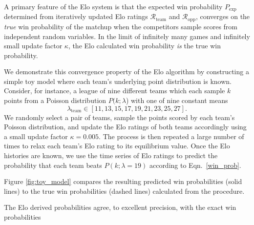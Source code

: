 \documentclass[aps,prc,reprint,amsmath,superscriptaddress,nofootinbib]{revtex4-1}
\newcommand{\R}{\mathcal{R}}
\begin{document}

A primary feature of the Elo system is that the expected win probability $P_\text{exp}$ determined from iteratively updated Elo ratings $\R_\text{team}$ and $\R_\text{opp}$, converges on the \emph{true} win probability of the matchup when the competitors sample scores from independent random variables.
In the limit of infinitely many games and infinitely small update factor $\kappa$, the Elo calculated win probability \emph{is} the true win probability.

We demonstrate this convergence property of the Elo algorithm by constructing a simple toy model where each team's underlying point distribution is known.
Consider, for instance, a league of nine different teams which each sample $k$ points from a Poisson distribution $P(k; \lambda$) with one of nine constant means
\begin{equation}
  \lambda_\text{team} \in [11, 13, 15, 17, 19, 21, 23, 25, 27].
\end{equation}
We randomly select a pair of teams, sample the points scored by each team's Poisson distribution, and update the Elo ratings of both teams accordingly using a small update factor $\kappa = 0.005$.
The process is then repeated a large number of times to relax each team's Elo rating to its equilibrium value.
Once the Elo histories are known, we use the time series of Elo ratings to predict the probability that each team beats $P(k; \lambda=19)$ according to Eqn.~\eqref{win_prob}.

Figure \ref{fig:toy_model} compares the resulting predicted win probabilities (solid lines) to the true win probabilities (dashed lines) calculated from the procedure.

The Elo derived probabilities agree, to excellent precision, with the exact win probabilities 
\end{document}

